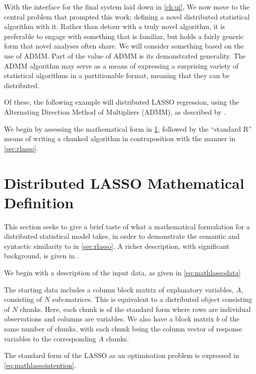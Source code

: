 With the interface for the final system laid down in \cref{ch:ui}, We now move to the central problem that prompted this work; defining a novel distributed statistical algorithm with it.
Rather than detour with a truly novel algorithm, it is preferable to engage with something that is familiar, but holds a fairly generic form that novel analyses often share.
We will consider something based on the use of ADMM.
Part of the value of ADMM is its demonstrated generality.
The ADMM algorithm may serve as a means of expressing a surprising variety of statistical algorithms in a partitionable format, meaning that they can be distributed.


Of these, the following example will distributed LASSO regression, using the Alternating Direction Method of Multipliers (ADMM), as described by \textcite{mateos2010}.

We begin by assessing the mathematical form in \cref{sec:mathlasso}, followed by the ``standard R'' means of writing a chunked algorithm in contraposition with the \lsr{} manner in \cref{sec:rlasso}.

\section{Distributed LASSO Mathematical Definition}\label{sec:mathlasso}

This section seeks to give a brief taste of what a mathematical formulation for a distributed statistical model takes, in order to demonstrate the semantic and syntactic similarity to \lsr{} in \cref{sec:rlasso}.
A richer description, with significant background, is given in \textcite{boyd2011}.

We begin with a description of the input data, as given in \cref{eq:mathlassodata}


The starting data includes a column block matrix of explanatory variables, $A$, consisting of $N$ sub-matrices.
This is equivalent to a distributed object consisting of $N$ chunks.
Here, each chunk is of the standard form where rows are individual observations and columns are variables.
We also have a block matrix $b$ of the same number of chunks, with each chunk being the column vector of response variables to the corresponding $A$ chunks.

The standard form of the LASSO as an optimisation problem is expressed in \cref{eq:mathlassointention}.


